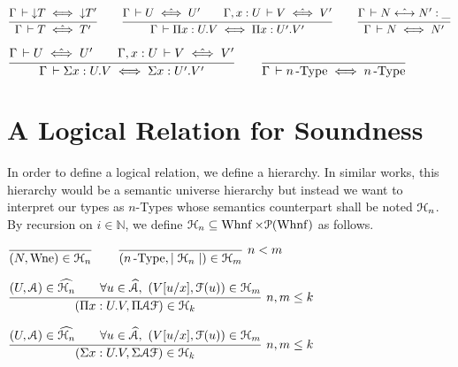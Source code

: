 \documentclass[a4paper,english]{lipics-utf8x}
\begin{document}

  \begin{center}
  \(
    \ru{\Gamma \der \red T \iff \red T'
      }{\Gamma \der T \hiff T'}
    \qquad
    \ru{\Gamma \der U \hiff U' \qquad
        \Gamma, x:U \der V \hiff V'
      }{\Gamma \der \Pi x:U.V \iff \Pi x:U'.V'}
    \qquad
    \ru{\Gamma \der N \hsteq N' : \_
      }{\Gamma \der N \iff N'}
  \)
  \end{center}

  \begin{center}
  \(
    \ru{\Gamma \der U \hiff U' \qquad
        \Gamma, x:U \der V \hiff V'
      }{\Gamma \der \Sigma x:U.V \iff \Sigma x:U'.V'}
    \qquad
    \ru{}{\Gamma \der \nType{n} \iff \nType{n}}
  \)
  \end{center}

  \section{A Logical Relation for Soundness}


  In order to define a logical relation, we define a hierarchy.
  In similar works, this hierarchy would be a semantic universe hierarchy but
  instead we want to interpret our types as $n$-Types whose semantics
  counterpart shall be noted $\mathcal{H}_n$.
  By recursion on $i \in \mathbb{N}$, we define
  $\mathcal{H}_n \subseteq \operatorname{Whnf} \times \mathcal{P}(\operatorname{Whnf})$ as follows.

  \begin{center}
  \(
    \ru{}{(N, \Wne) \in \Hu_n}
    \qquad
    \rux{}{(\nType{n}, \mid \Hu_n \mid) \in \Hu_m}{n < m}
  \)
  \end{center}

  \begin{center}
  \(
    \rux{(U, \mathcal{A}) \in \widehat{\Hu_n} \qquad
        \forall u \in \widehat{\mathcal{A}},\ (V[u/x], \mathcal{F}(u)) \in \Hu_m
       }{(\Pi x:U.V, \Pi \mathcal{A} \mathcal{F}) \in \Hu_k
       }{n,m \le k}
  \)
  \end{center}

  \begin{center}
  \(
    \rux{(U, \mathcal{A}) \in \widehat{\Hu_n} \qquad
        \forall u \in \widehat{\mathcal{A}},\ (V[u/x], \mathcal{F}(u)) \in \Hu_m
       }{(\Sigma x:U.V, \Sigma \mathcal{A} \mathcal{F}) \in \Hu_k
       }{n,m \le k}
  \)
  \end{center}
\end{document}

